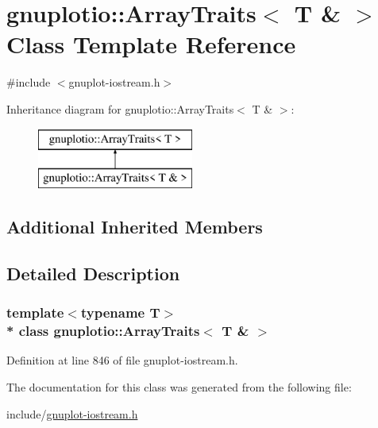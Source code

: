 \hypertarget{classgnuplotio_1_1_array_traits_3_01_t_01_6_01_4}{}\section{gnuplotio\+:\+:Array\+Traits$<$ T \& $>$ Class Template Reference}
\label{classgnuplotio_1_1_array_traits_3_01_t_01_6_01_4}


{\ttfamily \#include $<$gnuplot-\/iostream.\+h$>$}

Inheritance diagram for gnuplotio\+:\+:Array\+Traits$<$ T \& $>$\+:\begin{figure}[H]
\begin{center}
\leavevmode
\includegraphics[height=2.000000cm]{classgnuplotio_1_1_array_traits_3_01_t_01_6_01_4}
\end{center}
\end{figure}
\subsection*{Additional Inherited Members}


\subsection{Detailed Description}
\subsubsection*{template$<$typename T$>$\\*
class gnuplotio\+::\+Array\+Traits$<$ T \& $>$}



Definition at line 846 of file gnuplot-\/iostream.\+h.



The documentation for this class was generated from the following file\+:\begin{DoxyCompactItemize}
\item 
include/\hyperlink{gnuplot-iostream_8h}{gnuplot-\/iostream.\+h}\end{DoxyCompactItemize}
